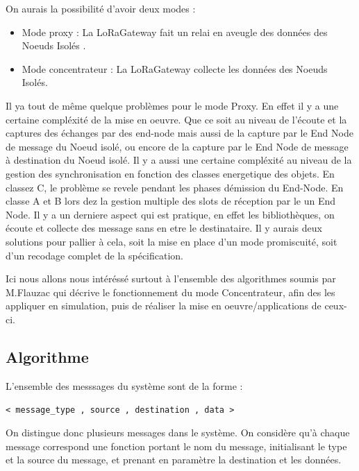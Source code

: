 \documentclass[11pt]{article}
\begin{document}
On aurais la possibilité d'avoir deux modes : 
\begin{itemize}
\item Mode proxy : La LoRaGateway fait un relai en aveugle des données des Noeuds Isolés .
\item Mode concentrateur : La LoRaGateway collecte les données des Noeuds Isolés.
\end{itemize}
Il ya tout de même quelque problèmes pour le mode Proxy. 
En effet il y a une certaine compléxité de la mise en oeuvre. Que ce soit au niveau de l'écoute et la captures des échanges par des end-node mais aussi de la capture par le End Node de message du Noeud isolé, ou encore de la capture par le End Node de message à destination du Noeud isolé. Il y a aussi une certaine compléxité au niveau de la gestion des synchronisation en fonction des classes energetique des objets. En classez C, le problème se revele pendant les phases démission du End-Node. En classe A et B lors dez la gestion multiple des slots de réception par le un End Node. Il y a un derniere aspect qui est pratique, en effet les bibliothèques, on écoute et collecte des message sans en etre le destinataire. Il y aurais deux solutions pour pallier à cela, soit la mise en place d'un mode promiscuité, soit d'un recodage complet de la spécification.


Ici nous allons nous intéréssé surtout à l'ensemble des algorithmes soumis par M.Flauzac qui décrive le fonctionnement du mode Concentrateur, afin des les appliquer en  simulation, puis de réaliser la mise en oeuvre/applications de ceux-ci.

\newpage
\subsection{Algorithme}


L'ensemble des messsages du système sont de la forme :

\begin{center}
\texttt{< message\_type , source , destination , data >}
\end{center}

On distingue donc plusieurs messages dans le système. On considère qu'à chaque message correspond une fonction portant le nom du message, initialisant le type et la source du message, et prenant en paramètre la destination et les données.
\end{document}
